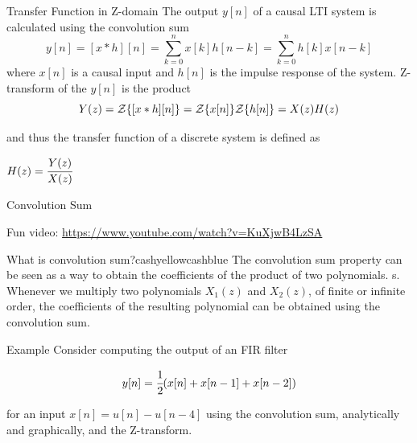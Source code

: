 \documentclass[aspectratio=169,xcolor=dvipsnames,svgnames,x11names,fleqn]{beamer}
\begin{document}
\begin{frame}{Transfer Function in Z-domain}
    The output $y[n]$ of a causal LTI system is calculated using the convolution sum
    $$
    y[n] = [x*h][n] = \sum_{k = 0}^n x[k]h[n-k] =  \sum_{k = 0}^n h[k]x[n-k]
    $$
    where $x[n]$ is a causal input and $h[n]$ is the impulse response of the system.  Z-transform of the $y[n]$ is the product
    $$
    Y(z) = {\mathcal Z}\{ [x*h][n] \} = {\mathcal Z}\{ x[n] \} {\mathcal Z}\{ h[n] \} = X(z) H(z)
    $$

    and thus the transfer function of a discrete system is defined as

    \begin{gradgreen}
        $H(z) = \cfrac{Y(z)}{X(z)}$
    \end{gradgreen}
    
\end{frame}

\begin{frame}{Convolution Sum}

Fun video: \url{https://www.youtube.com/watch?v=KuXjwB4LzSA}
    
\begin{custombox}{What is convolution sum?}{cashyellow}{cashblue}
    The convolution sum property can be seen as a way to obtain the coefficients of the product of two polynomials. s. Whenever we multiply two polynomials $X_1(z)$ and $X_2(z)$, of finite or infinite order, the
coefficients of the resulting polynomial can be obtained using the convolution sum.
\end{custombox}
\end{frame}


\begin{frame}{Example}
    Consider computing the output of an FIR filter

    $$
    y[n] = \cfrac{1}{2} ( x[n] + x[n-1] + x[n-2])
     $$

     for an input $x[n] = u[n] - u[n - 4]$ using the convolution sum, analytically and graphically, and the Z-transform.
\end{frame}

\begin{frame}{}
\vspace*{-9\baselineskip}
    \color{LightGray}{Blank space for calculation}
\end{frame}
\begin{frame}{}
\vspace*{-9\baselineskip}
    \color{LightGray}{Blank space for calculation}
\end{frame}
\begin{frame}{}
\vspace*{-9\baselineskip}
    \color{LightGray}{Blank space for calculation}
\end{frame}
\begin{frame}{}
\vspace*{-9\baselineskip}
    \color{LightGray}{Blank space for calculation}
\end{frame}
\end{document}
